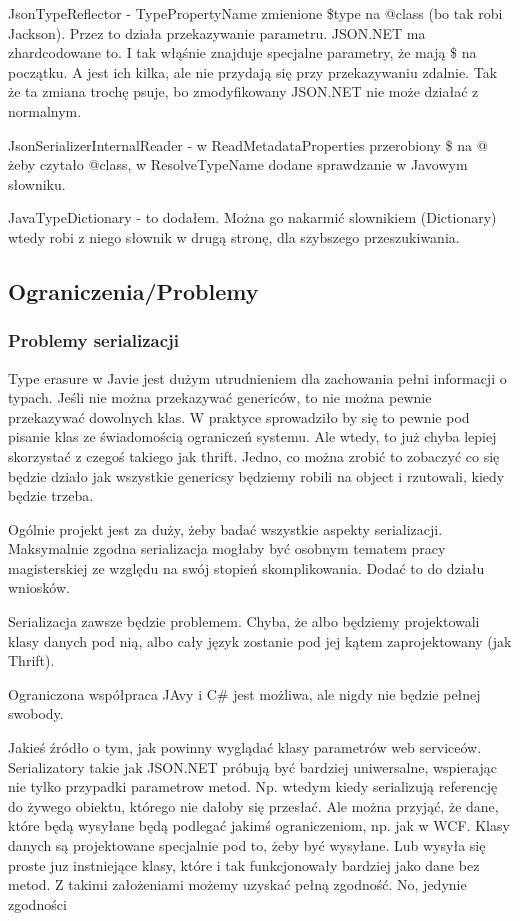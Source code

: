 JsonTypeReflector - TypePropertyName zmienione \$type na @class (bo tak robi Jackson). Przez to działa przekazywanie parametru. JSON.NET ma zhardcodowane to. I tak włąśnie znajduje specjalne parametry, że mają \$ na początku. A jest ich kilka, ale nie przydają się przy przekazywaniu zdalnie. Tak że ta zmiana trochę psuje, bo zmodyfikowany JSON.NET nie może działać z normalnym.

JsonSerializerInternalReader - w ReadMetadataProperties przerobiony \$ na @ żeby czytało @class, w ResolveTypeName dodane sprawdzanie w Javowym słowniku.

JavaTypeDictionary - to dodałem. Można go nakarmić slownikiem (Dictionary) wtedy robi z niego słownik w drugą stronę, dla szybszego przeszukiwania.


\subsection{Ograniczenia/Problemy}
\subsubsection{Problemy serializacji}
Type erasure w Javie jest dużym utrudnieniem dla zachowania pełni informacji o typach.
Jeśli nie można przekazywać genericów, to nie można pewnie przekazywać dowolnych klas. W praktyce sprowadziło by się to pewnie pod pisanie klas ze świadomością ograniczeń systemu. Ale wtedy, to już chyba lepiej skorzystać z czegoś takiego jak thrift.
Jedno, co można zrobić to zobaczyć co się będzie działo jak wszystkie genericsy będziemy robili na object i rzutowali, kiedy będzie trzeba.

Ogólnie projekt jest za duży, żeby badać wszystkie aspekty serializacji. Maksymalnie zgodna serializacja mogłaby być osobnym tematem pracy magisterskiej ze względu na swój stopień skomplikowania.
Dodać to do działu wniosków.

Serializacja zawsze będzie problemem. Chyba, że albo będziemy projektowali klasy danych pod nią, albo cały język zostanie pod jej kątem zaprojektowany (jak Thrift).

Ograniczona współpraca JAvy i C\# jest możliwa, ale nigdy nie będzie pełnej swobody.

Jakieś źródło o tym, jak powinny wyglądać klasy parametrów web serviceów.
Serializatory takie jak JSON.NET próbują być bardziej uniwersalne, wspierając nie tylko przypadki parametrow metod. Np. wtedym kiedy serializują referencję do żywego obiektu, którego nie dałoby się przesłać.
Ale można przyjąć, że dane, które będą wysyłane będą podlegać jakimś ograniczeniom, np. jak w WCF. Klasy danych są projektowane specjalnie pod to, żeby być wysyłane. Lub wysyła się proste juz instniejące klasy, które i tak funkcjonowały bardziej jako dane bez metod.
Z takimi założeniami możemy uzyskać pełną zgodność. No, jedynie zgodności

